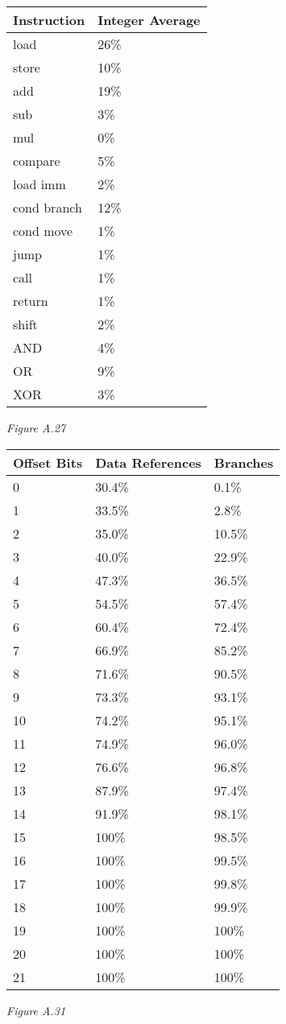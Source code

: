 \documentclass{article}
\begin{document}
\begin{multicols}{2}
\begin{minipage}{\linewidth}
\begin{tabular}{|l|l|}
\hline
Instruction & Integer Average\\
\hline
load & 26\%\\
store & 10\%\\
add & 19\%\\
sub & 3\%\\
mul & 0\%\\
compare & 5\%\\
load imm & 2\%\\
cond branch & 12\%\\
cond move & 1\%\\
jump & 1\%\\
call & 1\%\\
return & 1\%\\
shift & 2\%\\
AND & 4\%\\
OR & 9\%\\
XOR & 3\%\\
\hline
\end{tabular}\par
\bigskip
\textit{Figure A.27}
\end{minipage}
\vfill

\columnbreak
\begin{minipage}{\linewidth}
\begin{tabular}{|l|l|l|}
\hline
Offset Bits & Data References & Branches\\
\hline
0 & 30.4\% & 0.1\%\\
1 & 33.5\% & 2.8\%\\
2 & 35.0\% & 10.5\%\\
3 & 40.0\% & 22.9\%\\
4 & 47.3\% & 36.5\%\\
5 & 54.5\% & 57.4\%\\
6 & 60.4\% & 72.4\%\\
7 & 66.9\% & 85.2\%\\
8 & 71.6\% & 90.5\%\\
9 & 73.3\% & 93.1\%\\
10 & 74.2\% & 95.1\%\\
11 & 74.9\% & 96.0\%\\
12 & 76.6\% & 96.8\%\\
13 & 87.9\% & 97.4\%\\
14 & 91.9\% & 98.1\%\\
15 & 100\% & 98.5\%\\
16 & 100\% & 99.5\%\\
17 & 100\% & 99.8\%\\
18 & 100\% & 99.9\%\\
19 & 100\% & 100\%\\
20 & 100\% & 100\%\\
21 & 100\% & 100\%\\
\hline
\end{tabular}\par
\bigskip
\textit{Figure A.31}
\end{minipage}
\end{multicols} 
\end{document}
